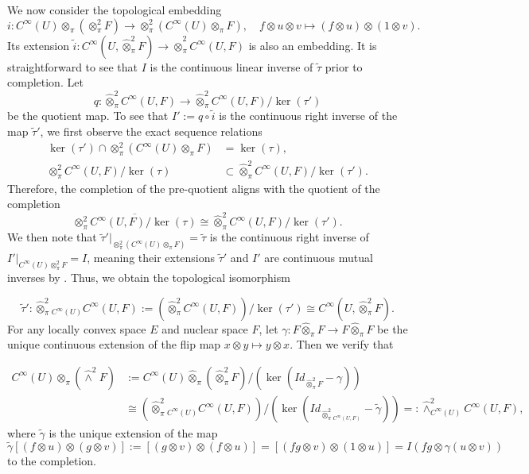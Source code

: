 \documentclass[11pt,reqno]{amsart}
\theoremstyle{definition}
\numberwithin{equation}{section}
\begin{document}
We now consider the topological embedding 
\[
i : C^{\infty}(U)\otimes_{\pi} (\otimes_{\pi}^2 F) \rightarrow \otimes^2_{\pi}(C^{\infty}(U) \otimes_{\pi} F), \quad f \otimes u \otimes v \mapsto (f \otimes u) \otimes (1 \otimes v).
\] 
Its extension $\tilde{i} : C^{\infty}(U, \hat{\otimes}_{\pi}^2 F) \rightarrow \hat{\otimes}_{\pi}^2 C^{\infty}(U, F)$ is also an embedding. It is straightforward to see that $I$ is the continuous linear inverse of $\tilde{\tau}$ prior to completion. Let 
\[
q : \hat\otimes^2_{\pi}C^{\infty}(U, F) \rightarrow \hat\otimes^2_{\pi}C^{\infty}(U, F)/\ker(\tau')
\] 
be the quotient map. To see that $I' := q \circ \tilde{i}$ is the continuous right inverse of the map $\tilde{\tau}'$, we first observe the exact sequence relations
\begin{align*}
\ker(\tau') \cap \otimes^2_{\pi}(C^{\infty}(U) \otimes_{\pi} F) &= \ker(\tau), \\
\otimes^2_{\pi}C^{\infty}(U, F)/\ker(\tau) &\subset \hat{\otimes}_{\pi}^2 C^{\infty}(U, F)/\ker(\tau').
\end{align*} 
Therefore, the completion of the pre-quotient aligns with the quotient of the completion
\[
\overline{\otimes^2_{\pi}C^{\infty}(U, F)/\ker(\tau)}\cong \hat{\otimes}_{\pi}^2 C^{\infty}(U, F)/\ker(\tau').
\]
We then note that $\tilde{\tau}'|_{\otimes^2_{\pi}(C^{\infty}(U) \otimes_{\pi} F)} = \tilde{\tau}$ is the continuous right inverse of $I'|_{C^{\infty}(U)\otimes_{\pi}^2 F} = I$, meaning their extensions $\tilde{\tau}'$ and $I'$ are continuous mutual inverses by \cite[Lemma 4.5]{14}. Thus, we obtain the topological isomorphism

\begin{equation}\label{wedgetensor}
\tilde{\tau}': \hat{\otimes}_{\pi}^2{}_{C^{\infty}(U)}C^{\infty}(U, F) := (\hat{\otimes}_{\pi}^2 C^{\infty}(U, F))/\ker(\tau') \cong C^{\infty}(U, \hat{\otimes}^2_{\pi}F).
\end{equation}
For any locally convex space $E$ and nuclear space $F$, let $\gamma : F \hat{\otimes}_{\pi} F \rightarrow F \hat{\otimes}_{\pi} F$ be the unique continuous extension of the flip map $x \otimes y \mapsto y \otimes x$. Then we verify that

\begin{align*}
C^{\infty}(U)\hat{\otimes}_{\pi} (\hat{\wedge}^2 F) &:= C^{\infty}(U)\hat{\otimes}_{\pi} (\hat{\otimes}_{\pi}^2 F)/(\ker (Id_{\hat{\otimes}_{\pi}^2 F}-\gamma)) \\ 
&\cong (\hat{\otimes}_{\pi}^2{}_{C^{\infty}(U)}C^{\infty}(U, F))/(\ker(Id_{\hat{\otimes}_{\pi}^2{}_{C^{\infty}(U, F)}}- \tilde{\gamma})) =: \hat{\wedge}^2_{C^{\infty}(U)}C^{\infty}(U, F),
\end{align*}
where $\tilde{\gamma}$ is the unique extension of the map 
\[
\tilde{\gamma}[(f \otimes u) \otimes (g \otimes v)] := [(g \otimes v) \otimes (f \otimes u)] = [(fg \otimes v) \otimes (1 \otimes u)] = I(fg \otimes \gamma(u \otimes v))
\] 
to the completion. 
\end{document}
